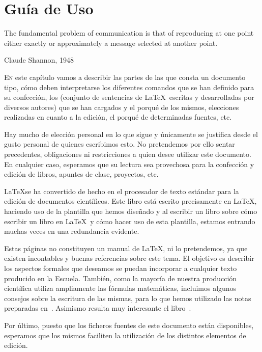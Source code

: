 \chapter{Guía de Uso}\label{chp-01}
\epigraph{The fundamental problem of communication is that of reproducing at one point either exactly or approximately a message selected at another point.}{Claude Shannon, 1948}

\lettrine[lraise=-0.1, lines=2, loversize=0.2]{E}{n} este capítulo vamos a describir las partes de las que consta un documento tipo, cómo deben interpretarse los diferentes comandos que se han definido para su confección, los  (conjunto de sentencias de \LaTeX\ escritas y desarrolladas por diversos autores) que se han cargados y el porqué de los mismos, elecciones realizadas en cuanto a la edición, el porqué de determinadas fuentes, etc. 

Hay mucho de elección personal en lo que sigue y únicamente se justifica desde el gusto personal de quienes escribimos esto. No pretendemos por ello sentar precedentes, obligaciones ni restricciones a quien desee utilizar este documento. En cualquier caso, esperamos que su lectura sea provechosa para la confección y edición de libros, apuntes de clase, proyectos, etc.

\LaTeX se ha convertido de hecho en el procesador de texto estándar para la edición de documentos científicos. Este libro está escrito precisamente en \LaTeX, haciendo uso de la plantilla que hemos diseñado y al escribir un libro sobre cómo escribir un libro en \LaTeX\  y cómo hacer uso de esta plantilla, estamos entrando muchas veces en una redundancia evidente.

Estas páginas no constituyen un manual de \LaTeX,  ni lo pretendemos, ya que existen incontables y buenas referencias sobre este tema. El objetivo es describir los aspectos formales que deseamos se puedan incorporar a cualquier texto producido en la Escuela.  También, como la mayoría de nuestra producción científica utiliza ampliamente las fórmulas matemáticas, incluimos algunos consejos sobre la escritura de las mismas, para lo que hemos utilizado las notas preparadas en~\cite{moser}. Asimismo resulta muy interesante el libro~\cite{gratzer}.

Por último, puesto que los ficheros fuentes de este documento están disponibles, esperamos que los mismos faciliten la utilización de los distintos elementos de edición.

